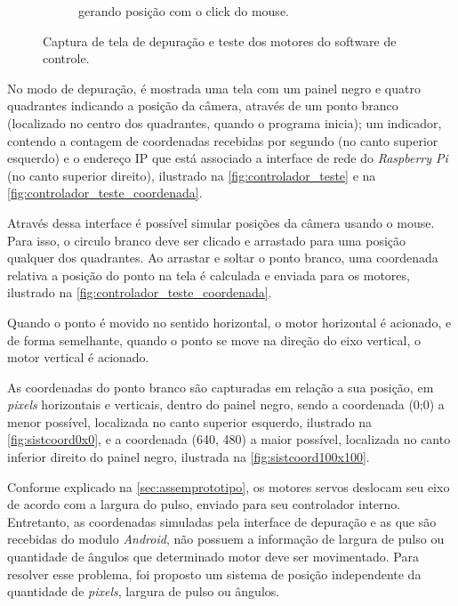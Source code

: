 \begin{figure}[H]
\begin{subfigure}{.5\textwidth}
		\caption{gerando posição com o click do mouse.}
		\label{fig:controlador_teste_coordenada}
	\end{subfigure}
	\caption{Captura de tela de depuração e teste dos motores do software de controle.}
\end{figure}

No modo de depuração, é mostrada uma tela com um painel negro e quatro quadrantes indicando a posição da câmera, através de um ponto branco (localizado no centro dos quadrantes, quando o programa inicia); um indicador, contendo a contagem de coordenadas recebidas por segundo (no canto superior esquerdo) e o endereço IP que está associado a interface de rede do \textit{Raspberry Pi} (no canto superior direito), ilustrado na \autoref{fig:controlador_teste} e na \autoref{fig:controlador_teste_coordenada}. \par

Através dessa interface é possível simular posições da câmera usando o mouse. Para isso, o circulo branco deve ser clicado e arrastado para uma posição qualquer dos quadrantes. Ao arrastar e soltar o ponto branco, uma coordenada relativa a posição do ponto na tela é calculada e enviada para os motores, ilustrado na \autoref{fig:controlador_teste_coordenada}.\par

Quando o ponto é movido no sentido horizontal, o motor horizontal é acionado, e de forma semelhante, quando o ponto se move na direção do eixo vertical, o motor vertical é acionado.\par

As coordenadas do ponto branco são capturadas em relação a sua posição, em \textit{pixels} horizontais e verticais, dentro do painel negro, sendo a coordenada (0;0) a menor possível, localizada no canto superior esquerdo, ilustrado na \autoref{fig:sistcoord0x0}, e a coordenada (640, 480) a maior possível, localizada no canto inferior direito do painel negro, ilustrada na \autoref{fig:sistcoord100x100}.\par

Conforme explicado na \autoref{sec:assemprototipo}, os motores servos deslocam seu eixo de acordo com a largura do pulso, enviado para seu controlador interno. Entretanto, as coordenadas simuladas pela interface de depuração e as que são recebidas do modulo \textit{Android}, não possuem a informação de largura de pulso ou quantidade de ângulos que determinado motor deve ser movimentado. Para resolver esse problema, foi proposto um sistema de posição independente da quantidade de \textit{pixels}, largura de pulso ou ângulos.\par

